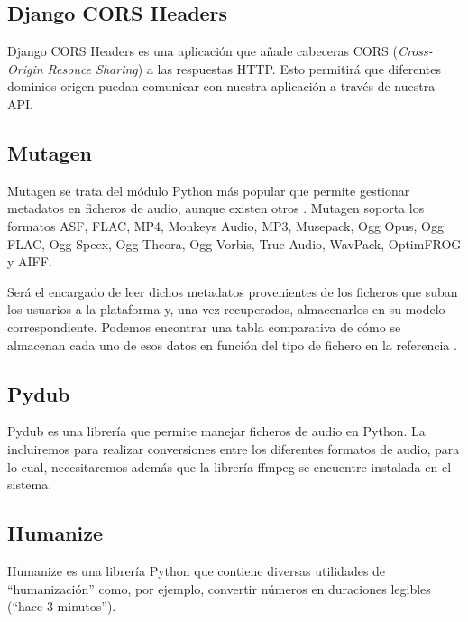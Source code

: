 \subsection{Django CORS Headers}

Django CORS Headers \cite{DjCORS} es una aplicación que añade cabeceras CORS (\textit{Cross-Origin Resouce Sharing}) a las respuestas HTTP. Esto permitirá que diferentes dominios origen puedan comunicar con nuestra aplicación a través de nuestra API.

\subsection{Mutagen}
Mutagen \cite{Mutagen} se trata del módulo Python más popular que permite gestionar metadatos en ficheros de audio, aunque existen otros \cite{PUMID3H}. Mutagen soporta los formatos ASF, FLAC, MP4, Monkey\textquotesingle s Audio, MP3, Musepack, Ogg Opus, Ogg FLAC, Ogg Speex, Ogg Theora, Ogg Vorbis, True Audio, WavPack, OptimFROG y AIFF.

Será el encargado de leer dichos metadatos provenientes de los ficheros que suban los usuarios a la plataforma y, una vez recuperados, almacenarlos en su modelo correspondiente. Podemos encontrar una tabla comparativa de cómo se almacenan cada uno de esos datos en función del tipo de fichero en la referencia \cite{TMMT}.

\subsection{Pydub}
Pydub \cite{pydub} es una librería que permite manejar ficheros de audio en Python. La incluiremos para realizar conversiones entre los diferentes formatos de audio, para lo cual, necesitaremos además que la librería ffmpeg \cite{ffmpeg} se encuentre instalada en el sistema.

\subsection{Humanize}

Humanize es una librería Python que contiene diversas utilidades de ``humanización'' como, por ejemplo, convertir números en duraciones legibles (``hace 3 minutos'').
